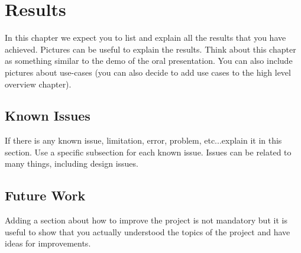 \chapter{Results}
In this chapter we expect you to list and explain all the results that you have achieved. Pictures can be useful to explain the results. Think about this chapter as something similar to the demo of the oral presentation. You can also include pictures about use-cases (you can also decide to add use cases to the high level overview chapter).
\section{Known Issues}
If there is any known issue, limitation, error, problem, etc...explain it in this section. Use a specific subsection for each known issue. Issues can be related to many things, including design issues.
\section{Future Work}
Adding a section about how to improve the project is not mandatory but it is useful to show that you actually understood the topics of the project and have ideas for improvements.
